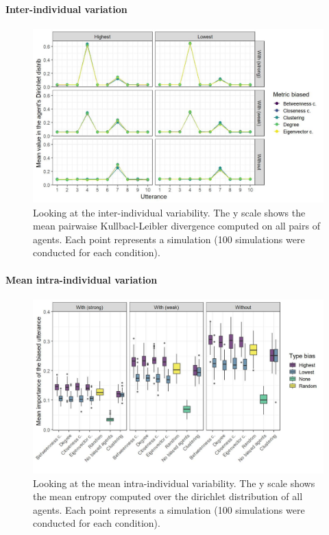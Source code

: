 \documentclass[
]{article}
\begin{document}
\hypertarget{inter-individual-variation-1}{%
\paragraph{Inter-individual
variation}\label{inter-individual-variation-1}}

\begin{figure}[!H]

{\centering \includegraphics{./Figures/unnamed-chunk-200-1} 

}

\caption{Looking at the inter-individual variability. The y scale shows the mean pairwaise Kullbacl-Leibler divergence computed on all pairs of agents. Each point represents a simulation (100 simulations were conducted for each condition).}\label{fig:unnamed-chunk-200}
\end{figure}

\hypertarget{mean-intra-individual-variation-1}{%
\paragraph{Mean intra-individual
variation}\label{mean-intra-individual-variation-1}}

\begin{figure}[!H]

{\centering \includegraphics{./Figures/unnamed-chunk-201-1} 

}

\caption{Looking at the mean intra-individual variability. The y scale shows the mean entropy computed over the dirichlet distribution of all agents. Each point represents a simulation (100 simulations were conducted for each condition).}\label{fig:unnamed-chunk-201}
\end{figure}
\end{document}
